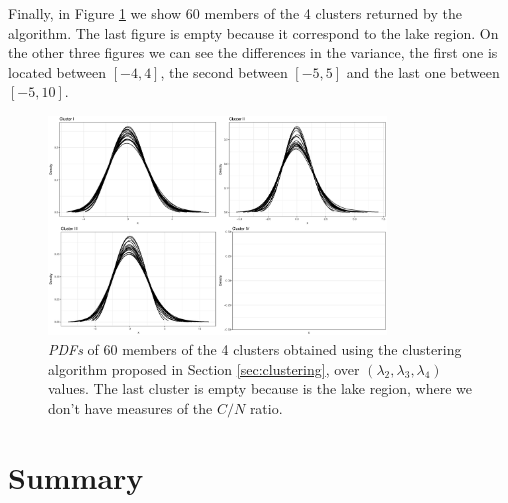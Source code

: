 Finally, in Figure \ref{fig:clusters_suq2} we show 60 members of the 4 clusters returned by the algorithm. The last figure is empty because it correspond to the lake region. On the other three figures we can see the differences in the variance, the first one is located between $[-4, 4]$, the second between $[-5, 5]$ and the last one between $[-5, 10]$.

\begin{figure}[H]
    \centering
    \includegraphics[width=0.8\textwidth]{img/use_cases/spus/clusters.eps}
    \caption{\textit{PDFs} of 60 members of the 4 clusters obtained using the clustering algorithm proposed in Section \ref{sec:clustering}, over $(\lambda_{2}, \lambda_{3}, \lambda_{4})$ values. The last cluster is empty because is the lake region, where we don't have measures of the $C/N$ ratio.}
    \label{fig:clusters_suq2}
\end{figure}

\section{Summary}\label{sec:use_case_summary}
